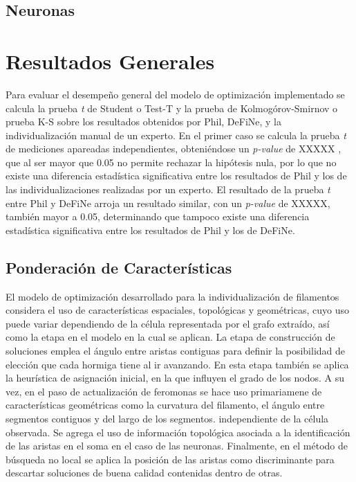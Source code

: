 \subsection{Neuronas}

\section{Resultados Generales}
Para evaluar el desempe\~no general del modelo de optimizaci\'on implementado se calcula la prueba {\it t} de Student o Test-T y la prueba de Kolmog\'orov-Smirnov o prueba K-S sobre los resultados obtenidos por Phil, DeFiNe, y la individualizaci\'on manual de un experto. En el primer caso se calcula la prueba {\it t} de mediciones apareadas independientes, obteni\'endose un {\it p-value} de XXXXX , que al ser mayor que 0.05 no permite rechazar la hip\'otesis nula, por lo que no existe una diferencia estad\'istica significativa entre los resultados de Phil y los de las individualizaciones realizadas por un experto. El resultado de la prueba {\it t} entre Phil y DeFiNe arroja un resultado similar, con un {\it p-value} de XXXXX, tambi\'en mayor a 0.05, determinando que tampoco existe una diferencia estad\'istica significativa entre los resultados de Phil y los de DeFiNe.


\subsection{Ponderaci\'on de Caracter\'isticas}
\label{subsec:ponderacion}
El modelo de optimizaci\'on desarrollado para la individualizaci\'on de filamentos considera el uso de caracter\'isticas espaciales, topol\'ogicas y geom\'etricas, cuyo uso puede variar dependiendo de la c\'elula representada por el grafo extra\'ido, as\'i como la etapa en el modelo en la cual se aplican. La etapa de construcci\'on de soluciones emplea el \'angulo entre aristas contiguas para definir la posibilidad de elecci\'on que cada hormiga tiene al ir avanzando. En esta etapa tambi\'en se aplica la heur\'istica de asignaci\'on inicial, en la que influyen el grado de los nodos. A su vez, en el paso de actualizaci\'on de feromonas se hace uso primariamene de caracter\'isticas geom\'etricas como  la curvatura del filamento, el \'angulo entre segmentos contiguos y del largo de los segmentos. independiente de la c\'elula observada. Se agrega el uso de informaci\'on topol\'ogica asociada a la identificaci\'on de las aristas en el soma en el caso de las neuronas. Finalmente, en el m\'etodo de b\'usqueda no local se aplica la posici\'on de las aristas como discriminante para descartar soluciones de buena calidad contenidas dentro de otras.

